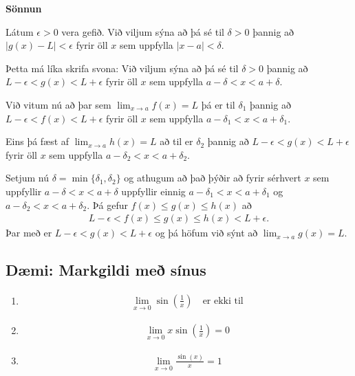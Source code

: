 \documentclass[a4paper,10pt,icelandic]{sphinxmanual}
\begin{document}
\textbf{Sönnun}

Látum \(\epsilon>0\) vera gefið. Við viljum sýna að þá sé til \(\delta>0\) þannig
að \(|g(x)-L|<\epsilon\) fyrir öll \(x\) sem uppfylla \(|x-a|<\delta\).

Þetta má líka skrifa svona:
Við viljum sýna að þá sé til \(\delta>0\) þannig
að \(L-\epsilon<g(x)<L+\epsilon\) fyrir öll \(x\) sem uppfylla \(a-\delta < x<a+\delta\).

Við vitum nú að þar sem \(\lim_{x\to a} f(x) = L\) þá er til \(\delta_1\)
þannig að \(L-\epsilon<f(x)<L+\epsilon\) fyrir öll \(x\) sem uppfylla \(a-\delta_1 < x<a+\delta_1\).

Eins þá fæst af \(\lim_{x\to a} h(x) = L\) að til er \(\delta_2\)
þannig að \(L-\epsilon<g(x)<L+\epsilon\) fyrir öll \(x\) sem uppfylla \(a-\delta_2 < x<a+\delta_2\).

Setjum nú \(\delta = \min\{\delta_1,\delta_2\}\) og athugum að það þýðir að fyrir sérhvert \(x\) sem
uppfyllir \(a-\delta < x < a+\delta\) uppfyllir einnig \(a-\delta_1 < x<a+\delta_1\)
og \(a-\delta_2 < x<a+\delta_2\). Þá gefur \(f(x)\leq g(x)\leq h(x)\) að
\begin{equation*}
\begin{split}L-\epsilon<f(x) \leq g(x) \leq h(x) < L+\epsilon.\end{split}
\end{equation*}
Þar með er \(L-\epsilon < g(x) < L+\epsilon\) og þá höfum við sýnt að
\(\lim_{x\to a} g(x) = L\).


\subsection{Dæmi: Markgildi með sínus}
\label{kafli02:daemi-markgildi-me-sinus}\begin{enumerate}
\item {} \begin{equation*}
\begin{split}\lim_{x\to 0} \sin\left(\frac 1x\right) \quad \text{er ekki til}\end{split}
\end{equation*}
\item {} \begin{equation*}
\begin{split}\lim_{x\to 0} x\sin\left(\frac 1x\right) = 0\end{split}
\end{equation*}
\item {} \begin{equation*}
\begin{split}\lim_{x \to 0} \frac{\sin(x)}{x} = 1\end{split}
\end{equation*}
\end{enumerate}
\end{document}
